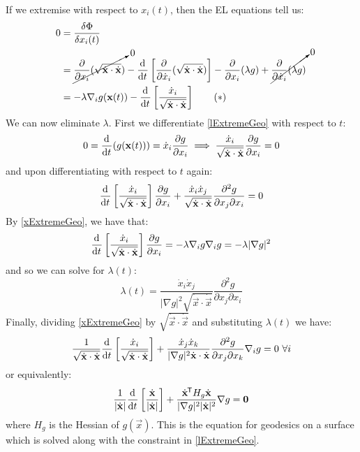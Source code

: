 \documentclass[../main.tex]{subfiles}
\begin{document}
If we extremise with respect to $x_i(t)$, then the EL equations tell us:
\begin{align}
  0 &= \frac{\delta \Phi}{\delta x_i(t)} \nonumber \\
    &= \cancelto{0}{\pderiv{}{x_i}(\sqrt{\dot{\vec{x}} \cdot \dot{\vec{x}}})} - \deriv{}{t}\left[\pderiv{}{\dot{x}_i}(\sqrt{\dot{\vec{x}} \cdot \dot{\vec{x}}})\right] - \pderiv{}{x_i} (\lambda g) + \cancelto{0}{\pderiv{}{\dot{x}_i} (\lambda g)} \nonumber \\
    &= - \lambda \nabla_{i}g(\vec{x}(t)) - \deriv{}{t}\left[\frac{\dot{x}_i}{\sqrt{\dot{\vec{x}} \cdot \dot{\vec{x}}}}\right] \tag{$\ast$} \label{xExtremeGeo}
\end{align}
We can now eliminate $\lambda$.
First we differentiate \cref{lExtremeGeo} with respect to $t$:
\[
  0 = \deriv{}{t}(g(\vec{x}(t))) = \dot{x}_i \pderiv{g}{x_i} \implies \frac{\dot{x}_i}{\sqrt{\dot{\vec{x}} \cdot \dot{\vec{x}}}} \pderiv{g}{x_i} = 0
\]
and upon differentiating with respect to $t$ again:
\begin{align*}
  \deriv{}{t} \left[\frac{\dot{x}_i}{\sqrt{\dot{\vec{x}} \cdot \dot{\vec{x}}}}\right] \pderiv{g}{x_i} + \frac{\dot{x}_i \dot{x}_j}{\sqrt{\dot{\vec{x}} \cdot \dot{\vec{x}}}} \frac{\partial^2 g}{\partial x_j \partial x_i} = 0 \\
\end{align*}
By \cref{xExtremeGeo}, we have that:
\[
  \deriv{}{t} \left[\frac{\dot{x}_i}{\sqrt{\dot{\vec{x}} \cdot \dot{\vec{x}}}}\right] \pderiv{g}{x_i} = - \lambda \nabla_i g \nabla_i g = -\lambda |\nabla g|^2
\]
and so we can solve for $\lambda(t)$:
\[
  \lambda(t) = \frac{\dot{x}_i \dot{x}_j}{|\nabla g|^2 \sqrt{\dot{\vec{x}} \cdot \dot{\vec{x}}}} \frac{\partial^2 g}{\partial x_j \partial x_i}
\]
Finally, dividing \cref{xExtremeGeo} by $\sqrt{\dot{\vec{x}} \cdot \dot{\vec{x}}}$ and substituting $\lambda(t)$ we have:
\[
  \frac{1}{\sqrt{\dot{\vec{x}} \cdot \dot{\vec{x}}}}\deriv{}{t} \left[\frac{\dot{x}_i}{\sqrt{\dot{\vec{x}} \cdot \dot{\vec{x}}}}\right] + \frac{\dot{x}_j \dot{x}_k}{|\nabla g|^2 \dot{\vec{x}} \cdot \dot{\vec{x}}} \frac{\partial^2 g}{\partial x_j \partial x_k} \nabla_i g = 0\ \forall i
\]
or equivalently:
\begin{equation}
  \frac{1}{|\dot{\vec{x}}|} \deriv{}{t}\left[\frac{\dot{\vec{x}}}{|\dot{\vec{x}}|}\right] + \frac{\dot{\vec{x}}^{\trans} H_g \dot{\vec{x}}}{|\nabla g|^2 |\dot{\vec{x}}|^2}  \nabla g = \vec{0} \label{geodesicEqn}
\end{equation}
where $H_g$ is the Hessian of $g(\vec{x})$.
This is the equation for geodesics on a surface which is solved along with the constraint in \cref{lExtremeGeo}.
\end{document}
